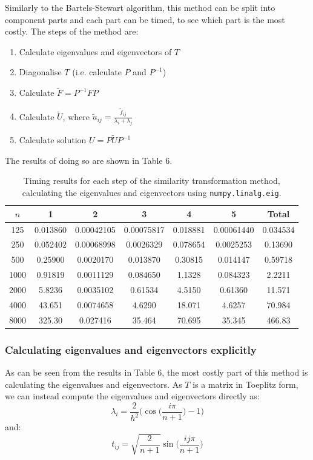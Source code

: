 \documentclass{article}
\numberwithin{equation}{section}
\begin{document}
Similarly to the Bartels-Stewart algorithm, this method can be split into component parts and each part can be timed, to see which part is the most costly. The steps of the method are:
\begin{enumerate}
\item Calculate eigenvalues and eigenvectors of $T$
\item Diagonalise $T$ (i.e. calculate $P$ and $P^{-1}$)
\item Calculate $\widetilde{F}=P^{-1}FP$
\item Calculate $\widetilde{U}$, where $\widetilde{u}_{ij} = \frac{\widetilde{f}_{ij}}{\lambda_i + \lambda_j}$
\item Calculate solution $U=P \widetilde{U}P^{-1}$
\end{enumerate}

The results of doing so are shown in Table 6.

\begin{table}[H]
\centering
\begin{tabular}{|c|c|c|c|c|c|c|}
\hline
$n$ & 1 & 2 & 3 & 4 & 5 & Total \\
\hline
125 & 0.013860 & 0.00042105 & 0.00075817 & 0.018881 & 0.00061440 & 0.034534 \\
250 & 0.052402 & 0.00068998 & 0.0026329 & 0.078654 & 0.0025253 & 0.13690 \\
500 & 0.25900 & 0.0020170 & 0.013870 & 0.30815 & 0.014147 & 0.59718 \\
1000 & 0.91819 & 0.0011129 & 0.084650 & 1.1328 & 0.084323 & 2.2211 \\
2000 & 5.8236 & 0.0035102 & 0.61534 & 4.5150 & 0.61360 & 11.571 \\
4000 & 43.651 & 0.0074658 & 4.6290 & 18.071 & 4.6257 & 70.984 \\
8000 & 325.30 & 0.027416 & 35.464 & 70.695 & 35.345 & 466.83 \\
\hline
\end{tabular}
\captionsetup{justification=centering}
\caption{Timing results for each step of the similarity transformation method, calculating the eigenvalues and eigenvectors using \texttt{numpy.linalg.eig}.}
\end{table}

\subsubsection*{Calculating eigenvalues and eigenvectors explicitly}

As can be seen from the results in Table 6, the most costly part of this method is calculating the eigenvalues and eigenvectors. As $T$ is a matrix in Toeplitz form, we can instead compute the eigenvalues and eigenvectors directly as:
\[ \lambda_i = \frac{2}{h^2} \Big( \cos \Big( \frac{i \pi}{n+1} \Big) - 1 \Big) \]
and:
\[ t_{ij} = \sqrt{\frac{2}{n+1}} \sin \Big( \frac{ij \pi}{n+1}  \Big) \]
\end{document}
